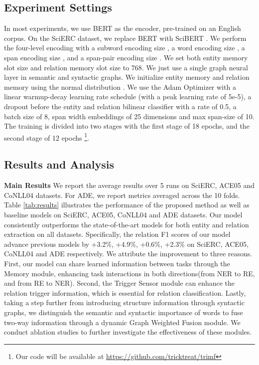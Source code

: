 \documentclass[sigconf]{acmart}
\begin{document}
\subsection{Experiment Settings}


In most experiments, we use BERT  \cite{devlin2018bert}
as the encoder, pre-trained on an English corpus. On the SciERC dataset, we replace BERT with SciBERT  \cite{beltagy2019scibert}. We perform the four-level encoding with a subword encoding size , a word encoding size , a span encoding size , and a span-pair encoding size . We set both entity memory slot size  and relation memory slot size  to 768.  We just use a single graph neural layer in semantic and syntactic graphs. We initialize entity memory and relation memory using the normal distribution .
We use the Adam Optimizer with a linear warmup-decay learning rate schedule (with a peak learning rate of 5e-5), a dropout before the entity and relation bilinear classifier with a rate of 0.5, a batch size of 8, span width embeddings of 25 dimensions and max span-size of 10. The training is divided into two stages with the first stage of 18 epochs, and the second stage of 12 epochs
\footnote{Our code will be available at \url{https://github.com/tricktreat/trimf}}.



\subsection{Results and Analysis}

\noindent\textbf{Main Results}
We report the average results over 5 runs on SciERC, ACE05 and CoNLL04 datasets. For ADE, we report metrics averaged across the 10 folds.
Table \ref{tab:results} illustrates the performance of the proposed method as well as baseline models on SciERC, ACE05, CoNLL04 and ADE datasets. Our model consistently outperforms the state-of-the-art models for both entity and relation extraction on all datasets. Specifically, the relation F1 scores of our model advance previous models by  +3.2\%, +4.9\%, +0.6\%, +2.3\% on SciERC, ACE05, CoNLL04 and ADE respectively. We attribute the improvement to three reasons. First, our model can share learned information between tasks through the Memory module, enhancing task interactions in both directions(from NER to RE, and from RE to NER). Second, the Trigger Sensor module can enhance the relation trigger information, which is essential for relation classification. Lastly, taking a step further from introducing structure information through syntactic graphs, we distinguish the semantic and syntactic importance of words to fuse two-way information through a dynamic Graph Weighted Fusion module. We conduct ablation studies to further investigate the effectiveness of these modules.
\end{document}
